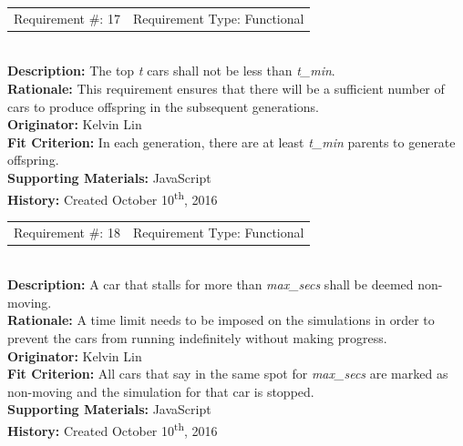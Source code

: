 \documentclass[12pt, titlepage]{article}
\begin{document}
\begin{reqbox}
	\begin{tabular}{cc}
		Requirement \#: 17 & Requirement Type: Functional \\
	\end{tabular} \\
	\textbf{Description:} The top \textit{t} cars shall not be less than 
	\textit{t\_min}. \\
	\textbf{Rationale:} This requirement ensures that there will be a sufficient 
	number of cars to produce offspring in the subsequent generations. \\
	\textbf{Originator:} Kelvin Lin\\
	\textbf{Fit Criterion:} In each generation, there are at least \textit{t\_min} 
	parents to generate offspring.\\
	\textbf{Supporting Materials:} JavaScript \\
	\textbf{History:} Created October 10\textsuperscript{th}, 2016
\end{reqbox}

\newpage

\begin{reqbox}
	\begin{tabular}{cc}
		Requirement \#: 18 & Requirement Type: Functional \\
	\end{tabular} \\
	\textbf{Description:} A car that stalls for more than \textit{max\_secs} shall 
	be deemed non-moving. \\
	\textbf{Rationale:} A time limit needs to be imposed on the simulations in 
order 
	to prevent the cars from running indefinitely without making progress. \\
	\textbf{Originator:} Kelvin Lin\\
	\textbf{Fit Criterion:} All cars that say in the same spot for 
	\textit{max\_secs} are marked as non-moving and the simulation for that car is 
	stopped.\\
	\textbf{Supporting Materials:} JavaScript \\
	\textbf{History:} Created October 10\textsuperscript{th}, 2016
\end{reqbox}
\end{document}
